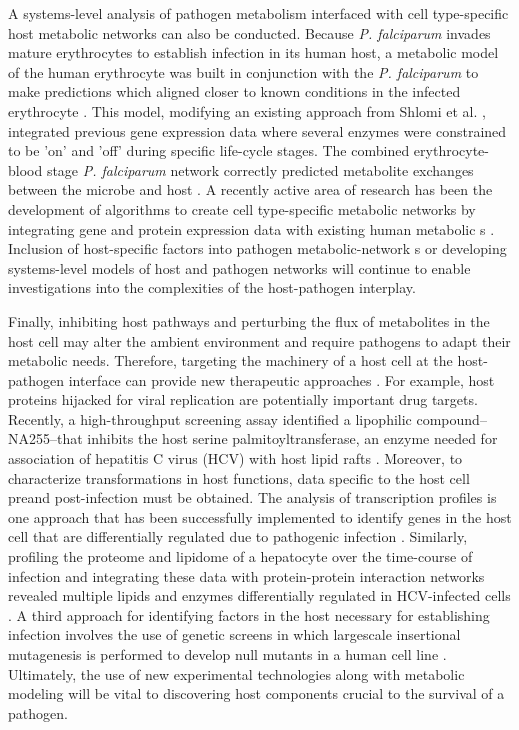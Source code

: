 A systems-level analysis of pathogen metabolism interfaced 
with cell type-specific host metabolic networks can also 
be conducted. Because \textit{P. falciparum} invades mature erythrocytes 
to establish infection in its human host, a metabolic model 
of the human erythrocyte was built in conjunction with the 
\textit{P. falciparum}  to make predictions which aligned 
closer to known conditions in the infected erythrocyte \cite{Huthmacher:2010hi}. 
This model, modifying an existing approach from Shlomi et al. \cite{Shlomi:2008ik}, 
integrated previous gene expression data where several enzymes 
were constrained to be 'on' and 'off' during specific life-cycle 
stages. The combined erythrocyte-blood stage \textit{P. falciparum} 
network correctly predicted metabolite exchanges between the 
microbe and host \cite{Huthmacher:2010hi}. A recently active area of research has 
been the development of algorithms to create cell type-specific 
metabolic networks by integrating gene and protein expression 
data with existing human metabolic s 
\cite{Shlomi:2008ik,Becker:2008iq,Jensen:2011ie}. Inclusion 
of host-specific factors into pathogen metabolic-network 
s or developing systems-level models of host and 
pathogen networks will continue to enable investigations into 
the complexities of the host-pathogen interplay.

Finally, inhibiting host pathways and perturbing the \gls{flux} of 
metabolites in the host cell may alter the ambient environment 
and require pathogens to adapt their metabolic needs. Therefore, 
targeting the machinery of a host cell at the host-pathogen 
interface can provide new therapeutic 
approaches \cite{Schwegmann:2008iq}. For 
example, host proteins hijacked for viral replication are 
potentially important drug targets. Recently, a high-throughput 
screening assay identified a lipophilic compound--NA255--that 
inhibits the host serine palmitoyltransferase, an enzyme 
needed for association of hepatitis C virus (HCV) with host 
lipid rafts \cite{Sakamoto:2005bd}. Moreover, to characterize transformations 
in host functions, data specific to the host cell preand 
post-infection must be obtained. The analysis of transcription 
profiles is one approach that has been successfully implemented 
to identify genes in the host cell that are differentially 
regulated due to pathogenic infection \cite{Handley:2006fc,Hossain:2006gl}. Similarly, 
profiling the proteome and lipidome of a hepatocyte over 
the time-course of infection and integrating these data with 
protein-protein interaction networks revealed multiple 
lipids and enzymes differentially regulated in HCV-infected 
cells \cite{Diamond:2010it}. A third approach for identifying factors in the 
host necessary for establishing infection involves the use 
of genetic screens in which largescale insertional mutagenesis 
is performed to develop null mutants in a human cell line \cite{Carette:2009ba}. 
Ultimately, the use of new experimental technologies along 
with metabolic modeling will be vital to discovering host 
components crucial to the survival of a pathogen.

